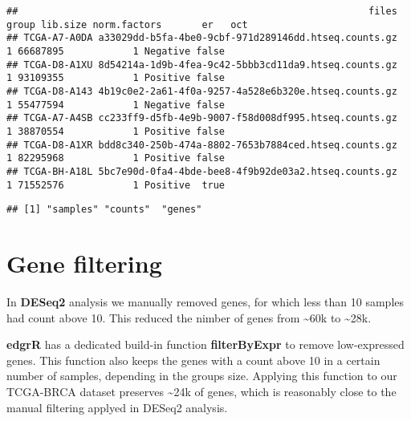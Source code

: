 \documentclass[]{book}
\newenvironment{Shaded}{\begin{snugshade}}{\end{snugshade}}
\newcommand{\KeywordTok}[1]{\textcolor[rgb]{0.13,0.29,0.53}{\textbf{#1}}}
\newcommand{\StringTok}[1]{\textcolor[rgb]{0.31,0.60,0.02}{#1}}
\newcommand{\CommentTok}[1]{\textcolor[rgb]{0.56,0.35,0.01}{\textit{#1}}}
\newcommand{\OperatorTok}[1]{\textcolor[rgb]{0.81,0.36,0.00}{\textbf{#1}}}
\newcommand{\NormalTok}[1]{#1}
\begin{document}
\begin{verbatim}
##                                                             files group lib.size norm.factors       er   oct
## TCGA-A7-A0DA a33029dd-b5fa-4be0-9cbf-971d289146dd.htseq.counts.gz     1 66687895            1 Negative false
## TCGA-D8-A1XU 8d54214a-1d9b-4fea-9c42-5bbb3cd11da9.htseq.counts.gz     1 93109355            1 Positive false
## TCGA-D8-A143 4b19c0e2-2a61-4f0a-9257-4a528e6b320e.htseq.counts.gz     1 55477594            1 Negative false
## TCGA-A7-A4SB cc233ff9-d5fb-4e9b-9007-f58d008df995.htseq.counts.gz     1 38870554            1 Positive false
## TCGA-D8-A1XR bdd8c340-250b-474a-8802-7653b7884ced.htseq.counts.gz     1 82295968            1 Positive false
## TCGA-BH-A18L 5bc7e90d-0fa4-4bde-bee8-4f9b92de03a2.htseq.counts.gz     1 71552576            1 Positive  true
\end{verbatim}

\begin{Shaded}
\end{Shaded}

\begin{verbatim}
## [1] "samples" "counts"  "genes"
\end{verbatim}

\section{Gene filtering}\label{gene-filtering}

In \textbf{DESeq2} analysis we manually removed genes, for which less
than 10 samples had count above 10. This reduced the nimber of genes
from \textasciitilde{}60k to \textasciitilde{}28k.

\textbf{edgrR} has a dedicated build-in function \textbf{filterByExpr}
to remove low-expressed genes. This function also keeps the genes with a
count above 10 in a certain number of samples, depending in the groups
size. Applying this function to our TCGA-BRCA dataset preserves
\textasciitilde{}24k of genes, which is reasonably close to the manual
filtering applyed in DESeq2 analysis.
\end{document}
